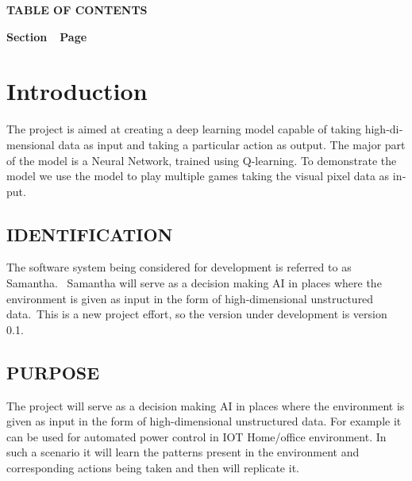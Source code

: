 \documentclass[twoside,letterpaper]{article}
\begin{document}
{\centering{}\bfseries\color{black}
TABLE OF CONTENTS
\par}


\bigskip

{\bfseries\color{black}
Section\ \ Page}

\setcounter{tocdepth}{9}
\renewcommand\contentsname{}
\tableofcontents

\bigskip

\clearpage\clearpage\setcounter{page}{1}\pagestyle{Convertii}
\section[Introduction]{\rmfamily\bfseries\color{black}
Introduction}
{\color{black}
\foreignlanguage{english}{{The project is aimed at creating a deep learning model capable of taking high-dimensional data as input and taking a particular action as output. The major part of the model is a Neural Network, trained using Q-learning. To demonstrate the model we use the model to play multiple games taking the visual pixel data as input.}}\foreignlanguage{english}{ \ }}

\subsection[IDENTIFICATION]{\rmfamily\bfseries\color{black}
IDENTIFICATION}
{\color{black}
The software system being considered for development is referred to as Samantha. \ Samantha will serve as a decision making AI in places where the environment is given as input in the form of high-dimensional unstructured data.\ This is a new project effort, so the
version under development is version 0.1.}

\subsection[PURPOSE]{\rmfamily\bfseries\color{black}
PURPOSE}
{\color{black}
The project will serve as a decision making AI in places where the environment is given as input in the form of high-dimensional unstructured data. For example it can be used for automated power control in IOT Home/office environment. In such a scenario it will learn the patterns present in the environment and corresponding actions being taken and then will replicate it.}
\end{document}
